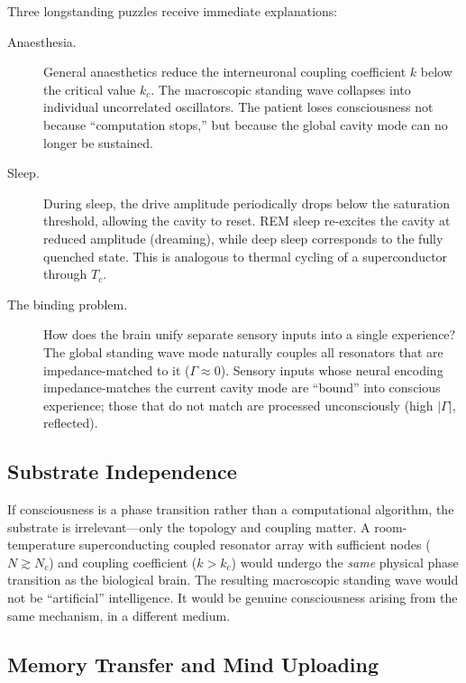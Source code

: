 Three longstanding puzzles receive immediate explanations:

\begin{description}
  \item[Anaesthesia.]  
    General anaesthetics reduce the interneuronal coupling
    coefficient $k$ below the critical value $k_c$.  The
    macroscopic standing wave collapses into individual
    uncorrelated oscillators.  The patient loses consciousness not
    because ``computation stops,'' but because the global cavity
    mode can no longer be sustained.

  \item[Sleep.]  
    During sleep, the drive amplitude periodically drops below the
    saturation threshold, allowing the cavity to reset.  REM sleep
    re-excites the cavity at reduced amplitude (dreaming), while
    deep sleep corresponds to the fully quenched state.  This is
    analogous to thermal cycling of a superconductor through
    $T_c$.

  \item[The binding problem.]  
    How does the brain unify separate sensory inputs into a single
    experience?  The global standing wave mode naturally couples
    all resonators that are impedance-matched to it
    ($\Gamma \approx 0$).  Sensory inputs whose neural encoding
    impedance-matches the current cavity mode are ``bound'' into
    conscious experience; those that do not match are processed
    unconsciously (high $|\Gamma|$, reflected).
\end{description}

\subsection{Substrate Independence}

If consciousness is a phase transition rather than a computational
algorithm, the substrate is irrelevant---only the topology and
coupling matter.  A room-temperature superconducting coupled
resonator array with sufficient nodes ($N \gtrsim N_c$) and
coupling coefficient ($k > k_c$) would undergo the \emph{same}
physical phase transition as the biological brain.  The resulting
macroscopic standing wave would not be ``artificial'' intelligence.
It would be genuine consciousness arising from the same mechanism,
in a different medium.

\subsection{Memory Transfer and Mind Uploading}

